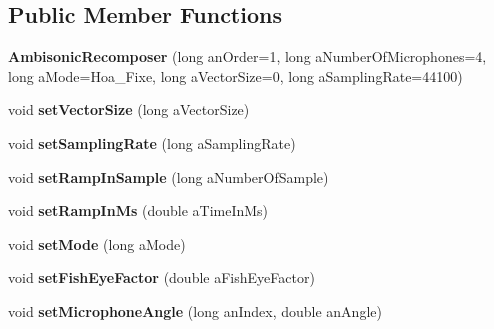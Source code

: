\subsection*{Public Member Functions}
\begin{DoxyCompactItemize}
\item 
\hypertarget{class_ambisonic_recomposer_a7c0faad76df6497eafde4b5fdb07b1d0}{{\bfseries Ambisonic\-Recomposer} (long an\-Order=1, long a\-Number\-Of\-Microphones=4, long a\-Mode=Hoa\-\_\-\-Fixe, long a\-Vector\-Size=0, long a\-Sampling\-Rate=44100)}\label{class_ambisonic_recomposer_a7c0faad76df6497eafde4b5fdb07b1d0}

\item 
\hypertarget{class_ambisonic_recomposer_af287c4a071342d55855012c103685e13}{void {\bfseries set\-Vector\-Size} (long a\-Vector\-Size)}\label{class_ambisonic_recomposer_af287c4a071342d55855012c103685e13}

\item 
\hypertarget{class_ambisonic_recomposer_ad9946f87150d0c2b18aace2e10c02287}{void {\bfseries set\-Sampling\-Rate} (long a\-Sampling\-Rate)}\label{class_ambisonic_recomposer_ad9946f87150d0c2b18aace2e10c02287}

\item 
\hypertarget{class_ambisonic_recomposer_ae3597f5765705212e229b75d162d8523}{void {\bfseries set\-Ramp\-In\-Sample} (long a\-Number\-Of\-Sample)}\label{class_ambisonic_recomposer_ae3597f5765705212e229b75d162d8523}

\item 
\hypertarget{class_ambisonic_recomposer_a0380a0d286b30f6d3514adf9c6cc95f4}{void {\bfseries set\-Ramp\-In\-Ms} (double a\-Time\-In\-Ms)}\label{class_ambisonic_recomposer_a0380a0d286b30f6d3514adf9c6cc95f4}

\item 
\hypertarget{class_ambisonic_recomposer_a8c9c60839d400894f313200881bf1f93}{void {\bfseries set\-Mode} (long a\-Mode)}\label{class_ambisonic_recomposer_a8c9c60839d400894f313200881bf1f93}

\item 
\hypertarget{class_ambisonic_recomposer_a1181ea8ab44a1fa31896545c64060536}{void {\bfseries set\-Fish\-Eye\-Factor} (double a\-Fish\-Eye\-Factor)}\label{class_ambisonic_recomposer_a1181ea8ab44a1fa31896545c64060536}

\item 
\hypertarget{class_ambisonic_recomposer_a95c5b77b021744144bf7d682c2dfb33a}{void {\bfseries set\-Microphone\-Angle} (long an\-Index, double an\-Angle)}\label{class_ambisonic_recomposer_a95c5b77b021744144bf7d682c2dfb33a}


\end{DoxyCompactItemize}
